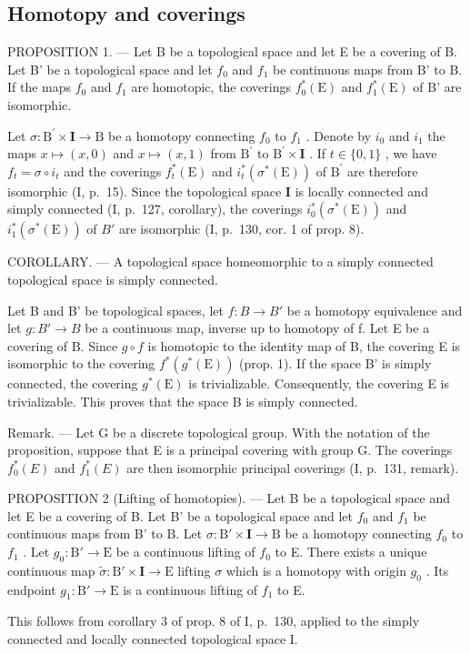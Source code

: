 \subsection{Homotopy and coverings}

PROPOSITION 1. --- Let B be a topological space and let E be a covering of B. Let B' be a topological space and let \(f_0\) and \(f_1\) be continuous maps from B' to B. If the maps \(f_0\) and \(f_1\) are homotopic, the coverings \(f_0^*(\mathrm{E})\) and \(f_1^*(\mathrm{E})\) of B' are isomorphic.

Let \(\sigma\colon\mathrm{B}^{\prime}\times\mathbf{I}\to\mathrm{B}\) be a homotopy connecting \(f_{0}\) to \(f_{1}\) . Denote by \(i_{0}\) and \(i_{1}\) the maps \(x\mapsto(x,0)\) and \(x\mapsto(x,1)\) from \(\mathrm{B}^{\prime}\) to \(\mathrm{B}^{\prime}\times\mathbf{I}\) . If \(t\in\{0,1\}\) , we have \(f_{t}=\sigma\circ i_{t}\) and the coverings \(f_{t}^{*}(\mathrm{E})\) and \(i_{t}^{*}(\sigma^{*}(\mathrm{E}))\) of \(\mathrm{B}^{\prime}\) are therefore isomorphic (I, p.~15). Since the topological space \(\mathbf{I}\) is locally connected and simply connected (I, p.~127, corollary), the coverings \(i_{0}^{*}(\sigma^{*}(\mathrm{E}))\) and \(i_{1}^{*}(\sigma^{*}(\mathrm{E}))\) of \(B'\) are isomorphic (I, p.~130, cor. 1 of prop. 8).

COROLLARY. --- A topological space homeomorphic to a simply connected topological space is simply connected.

Let B and B' be topological spaces, let \(f: B \rightarrow B'\) be a homotopy equivalence and let \(g: B' \rightarrow B\) be a continuous map, inverse up to homotopy of f. Let E be a covering of B. Since \(g \circ f\) is homotopic to the identity map of B, the covering E is isomorphic to the covering \(f^{*}(g^{*}(\mathrm{E}))\) (prop. 1). If the space B' is simply connected, the covering \(g^{*}(\mathrm{E})\) is trivializable. Consequently, the covering E is trivializable. This proves that the space B is simply connected.

Remark. --- Let G be a discrete topological group. With the notation of the proposition, suppose that E is a principal covering with group G. The coverings \(f_{0}^{*}(E)\) and \(f_{1}^{*}(E)\) are then isomorphic principal coverings (I, p.~131, remark).

PROPOSITION 2 (Lifting of homotopies). --- Let B be a topological space and let E be a covering of B. Let B' be a topological space and let \(f_0\) and \(f_1\) be continuous maps from B' to B. Let \(\sigma: \mathrm{B}' \times \mathbf{I} \to \mathrm{B}\) be a homotopy connecting \(f_0\) to \(f_1\) . Let \(g_0: \mathrm{B}' \to \mathrm{E}\) be a continuous lifting of \(f_0\) to E. There exists a unique continuous map \(\widetilde{\sigma}: \mathrm{B}' \times \mathbf{I} \to \mathrm{E}\) lifting \(\sigma\) which is a homotopy with origin \(g_0\) . Its endpoint \(g_1: \mathrm{B}' \to \mathrm{E}\) is a continuous lifting of \(f_1\) to E.

This follows from corollary 3 of prop. 8 of I, p.~130, applied to the simply connected and locally connected topological space I.

